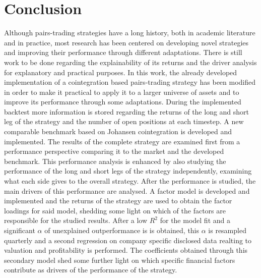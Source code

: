 \section{Conclusion}

Although pairs-trading strategies have a long history, both in academic literature and in practice, most research has been centered on developing novel strategies and improving their performance through different adaptations. There is still work to be done regarding the explainability of its returns and the driver analysis for explanatory and practical purposes. 
In this work, the already developed implementation of a cointegration based pairs-trading strategy has been modified in order to make it practical to apply it to a larger universe of assets and to improve its performance through some adaptations. During the implemented backtest more information is stored regarding the returns of the long and short leg of the strategy and the number of open positions at each timestep. A new comparable benchmark based on Johansen cointegration is developed and implemented. The results of the complete strategy are examined first from a performance perspective comparing it to the market and the developed benchmark. This performance analysis is enhanced by also studying the performance of the long and short legs of the strategy independently, examining what each side gives to the overall strategy. 
After the performance is studied, the main drivers of this performance are analysed. A factor model is developed and implemented and the returns of the strategy are used to obtain the factor loadings for said model, shedding some light on which of the factors are responsible for the studied results. After a low $R^2$ for the model fit and a significant $\alpha$ of unexplained outperformance is is obtained, this $\alpha$ is resampled quarterly and a second regression on company specific disclosed data realting to valuation and profitability is performed. The coefficients obtained through this secondary model shed some further light on which specific financial factors contribute as drivers of the performance of the strategy. 

